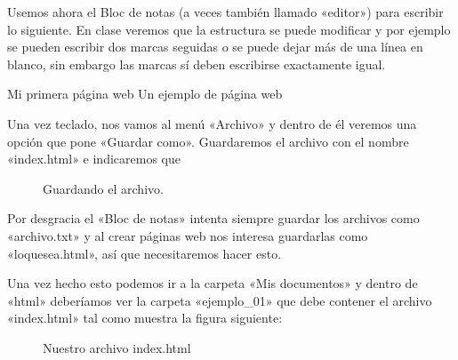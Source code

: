 \documentclass[a4paper,12pt,spanish]{sphinxmanual}
\begin{document}
Usemos ahora el Bloc de notas (a veces también llamado «editor») para escribir lo siguiente. En clase veremos que la estructura se puede modificar y por ejemplo se pueden escribir dos marcas seguidas o se puede dejar más de una línea en blanco, sin embargo las marcas sí deben escribirse exactamente igual.

%
\begin{sphinxVerbatim}[commandchars=\\\{\}]
         Mi primera página web
     Un ejemplo de página web
\end{sphinxVerbatim}

Una vez teclado, nos vamos al menú «Archivo» y dentro de él veremos una opción que pone «Guardar como». Guardaremos el archivo con el nombre «index.html» e indicaremos que 

\begin{figure}[htbp]
\centering
\capstart

\noindent{}
\caption{Guardando el archivo.}\label{\detokenize{index:id5}}\end{figure}

Por desgracia el «Bloc de notas» intenta siempre guardar los archivos como «archivo.txt» y al crear páginas web nos interesa guardarlas como «loquesea.html», así que necesitaremos hacer esto.

Una vez hecho esto podemos ir a la carpeta «Mis documentos» y dentro de «html» deberíamos ver la carpeta «ejemplo\_01» que debe contener el archivo «index.html» tal como muestra la figura siguiente:

\begin{figure}[htbp]
\centering
\capstart

\noindent{}
\caption{Nuestro archivo index.html}\label{\detokenize{index:id6}}\end{figure}
\end{document}
